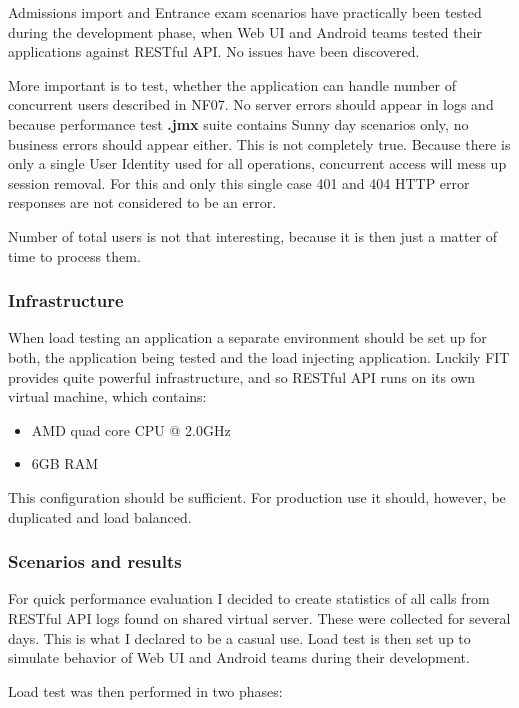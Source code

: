 	Admissions import and Entrance exam scenarios have practically been tested during the development phase, when Web UI
	and Android teams tested their applications against RESTful API. No issues have been discovered.
	
	More important is to test, whether the application can handle number of concurrent users described in NF07. No server
	errors should appear in logs and because performance test \textbf{.jmx} suite contains Sunny day scenarios only, no business
	errors should appear either. This is not completely true. Because there is only a single User Identity used for
	all operations, concurrent access will mess up session removal. For this and only this single case 401 and 404 HTTP
	error responses are not considered to be an error.
	
	Number of total users is not that interesting, because it is then just a matter of time to process them.
	
	\subsubsection{Infrastructure}
	
	When load testing an application a separate environment should be set up for both, the application being tested and
	the load injecting application. Luckily \gls{FIT} provides quite powerful infrastructure, and so RESTful
	API runs on its own virtual machine, which contains:
	
	\begin{itemize}
		\item AMD quad core CPU @ 2.0GHz
		\item 6GB RAM
	\end{itemize}
	
	This configuration should be sufficient. For production use it should, however, be duplicated and load balanced.
	
	\subsubsection{Scenarios and results}
	
	For quick performance evaluation I decided to create statistics of all calls from RESTful API logs found on shared
	virtual server. These were collected for several days.
	This is what I declared to be a casual use. Load test is then set up to simulate behavior of Web UI and Android teams
	during their development.
	
	Load test was then performed in two phases:
	

